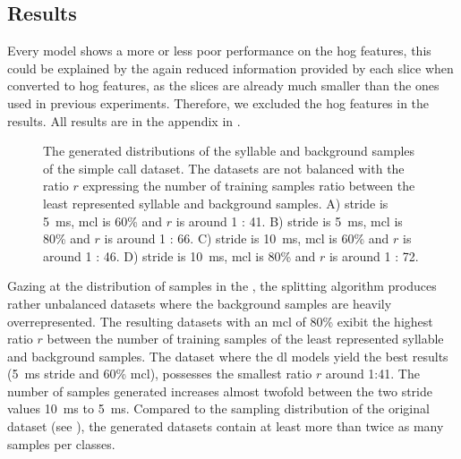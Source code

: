 \subsection{Results}
Every model shows a more or less poor performance on the \gls{hog} features, this could be explained by the again reduced information provided by each slice when converted to \gls{hog} features, as the slices are already much smaller than the ones used in previous experiments. Therefore, we excluded the \gls{hog} features in the results. All results are in the appendix in .

\begin{figure}[!htb]
  \centering
  \caption{The generated distributions of the syllable and background samples of the simple call dataset. The datasets are not balanced with the ratio $r$ expressing the number of training samples ratio between the least represented syllable and background samples.
  A) stride is \SI{5}{\milli\second}, \gls{mcl} is 60\% and $r$ is around 1 : 41.
  B) stride is \SI{5}{\milli\second}, \gls{mcl} is 80\% and $r$ is around 1 : 66.
  C) stride is \SI{10}{\milli\second}, \gls{mcl} is 60\% and $r$ is around 1 : 46.
  D) stride is \SI{10}{\milli\second}, \gls{mcl} is 80\% and $r$ is around 1 : 72.}
  \label{fig:dataset_scs_r3}
\end{figure}

Gazing at the distribution of samples in the , the splitting algorithm produces rather unbalanced datasets where the background samples are heavily overrepresented.
The resulting datasets with an \gls{mcl} of 80\% exibit the highest ratio $r$ between the number of training samples of the least represented syllable and background samples. The dataset where the \gls{dl} models yield the best results (\SI{5}{\milli\second} stride and 60\% \gls{mcl}), possesses the smallest ratio $r$ around 1:41.
The number of samples generated increases almost twofold between the two stride values \SI{10}{\milli\second} to \SI{5}{\milli\second}. Compared to the sampling distribution of the original dataset (see ), the generated datasets contain at least more than twice as many samples per classes.

